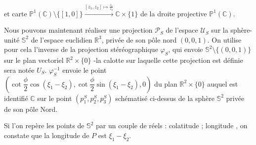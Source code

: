 et carte $\mathbb{P}^1(\mathbb{C})\setminus\{[1,0]\}\xrightarrow{[z_1,z_2] \mapsto \frac{z_1}{z_2}}\mathbb{C}\times\{1\}$ de la droite projective $\mathbb{P}^1(\mathbb{C})$.
\par
Nous pouvons maintenant r\'ealiser une projection $\mathcal{P}_S$ de l'espace $\mathcal{U}_S$ sur la sph\`ere-unit\'e $\mathbb{S}^2$ de l'espace euclidien $\mathbb{R}^3$, priv\'ee de son p\^ole nord $(0,0,1)$. %
On utilise pour cela l'inverse de la projection st\'er\'eographique $\varphi_S$, qui envoie $\mathbb{S}^2\setminus\{(0,0,1)\}$ sur le plan vectoriel $\mathbb{R}^2\times\{0\}$ -la calotte sur laquelle cette projection est d\'efinie sera not\'ee $U_S$.
%
%
\etoile
$\varphi_S^{-1}$ envoie le point $\left(\cot\dfrac{\phi}{2} \cos \left(\xi_1-\xi_2\right) , \cot\dfrac{\phi}{2} \sin\left(\xi_1-\xi_2\right) , 0\right)$ %
du plan $\mathbb{R}^2\times\{0\}$ auquel est identifi\'e $\mathbb{C}$ sur le point $(p_1^S,p_2^S,p_3^S)$ sch\'ematis\'e ci-dessus de la sph\`ere $\mathbb{S}^2$ priv\'ee de son p\^ole Nord.
\par
Si l'on rep\`ere les points de $\mathbb{S}^2$ par un couple de r\'eels : \og{}colatitude ; longitude\fg{} , on constate que la longitude de $P$ est $\xi_1-\xi_2$.%
%
%
\ligneinter
